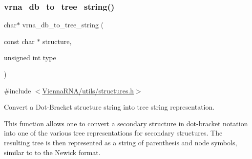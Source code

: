 \subsubsection{\texorpdfstring{vrna\+\_\+db\+\_\+to\+\_\+tree\+\_\+string()}{vrna\_db\_to\_tree\_string()}}
{\footnotesize\ttfamily char$\ast$ vrna\+\_\+db\+\_\+to\+\_\+tree\+\_\+string (\begin{DoxyParamCaption}\item[{const char $\ast$}]{structure,  }\item[{unsigned int}]{type }\end{DoxyParamCaption})}



{\ttfamily \#include $<$\hyperlink{utils_2structures_8h}{Vienna\+R\+N\+A/utils/structures.\+h}$>$}



Convert a Dot-\/\+Bracket structure string into tree string representation. 

This function allows one to convert a secondary structure in dot-\/bracket notation into one of the various tree representations for secondary structures. The resulting tree is then represented as a string of parenthesis and node symbols, similar to to the Newick format.

